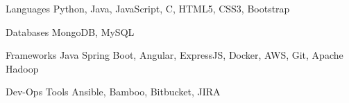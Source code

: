 
\begin{cvskills}
  \cvskill
    {Languages} %
    {Python, Java, JavaScript, C, HTML5, CSS3, Bootstrap} %
    
  \cvskill
    {Databases} %
    {MongoDB, MySQL} %


  \cvskill
    {Frameworks} %
    {Java Spring Boot, Angular, ExpressJS, Docker, AWS, Git, Apache Hadoop} %
    
  \cvskill
    {Dev-Ops Tools} %
    {Ansible, Bamboo, Bitbucket, JIRA } %
\end{cvskills}
